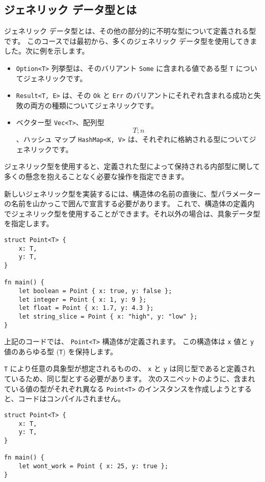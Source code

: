 \subsection{ジェネリック データ型とは}

ジェネリック データ型とは、その他の部分的に不明な型について定義される型です。 このコースでは最初から、多くのジェネリック データ型を使用してきました。次に例を示します。

\begin{itemize}
\item \texttt{Option<T>} 列挙型は、そのバリアント \texttt{Some} に含まれる値である型 \texttt{T} についてジェネリックです。
\item \texttt{Result<T, E>} は、その \texttt{Ok} と \texttt{Err} のバリアントにそれぞれ含まれる成功と失敗の両方の種類についてジェネリックです。
\item ベクター型 \texttt{Vec<T>}、配列型 \texttt{\[T; n\]}、ハッシュ マップ \texttt{HashMap<K, V>} は、それぞれに格納される型についてジェネリックです。
\end{itemize}

ジェネリック型を使用すると、定義された型によって保持される内部型に関して多くの懸念を抱えることなく必要な操作を指定できます。

新しいジェネリック型を実装するには、構造体の名前の直後に、型パラメーターの名前を山かっこで囲んで宣言する必要があります。 これで、構造体の定義内でジェネリック型を使用することができます。それ以外の場合は、具象データ型を指定します。


\begin{lstlisting}[numbers=none]
struct Point<T> {
    x: T,
    y: T,
}

fn main() {
    let boolean = Point { x: true, y: false };
    let integer = Point { x: 1, y: 9 };
    let float = Point { x: 1.7, y: 4.3 };
    let string_slice = Point { x: "high", y: "low" };
}
\end{lstlisting}

上記のコードでは、 \texttt{Point<T>} 構造体が定義されます。 この構造体は \texttt{x} 値と \texttt{y} 値のあらゆる型 (\texttt{T}) を保持します。

\texttt{T} により任意の具象型が想定されるものの、 \texttt{x} と \texttt{y} は同じ型であると定義されているため、同じ型とする必要があります。 次のスニペットのように、含まれている値の型がそれぞれ異なる \texttt{Point<T>} のインスタンスを作成しようとすると、コードはコンパイルされません。

\begin{lstlisting}[numbers=none]
struct Point<T> {
    x: T,
    y: T,
}

fn main() {
    let wont_work = Point { x: 25, y: true };
}
\end{lstlisting}


